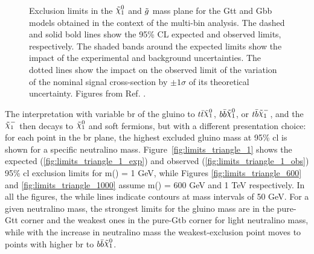 \begin{figure}[htbp]
	\centering 
	\caption{Exclusion limits in the $\ninoone$ and $\tilde{g}$ mass plane
  		for the  Gtt and   Gbb models obtained
		in the context of the multi-bin analysis. The dashed and solid bold lines
		show the 95\% CL expected and observed limits, respectively. The
  		shaded bands around the expected limits show the
                impact of the
  		experimental and background uncertainties. The dotted
  		lines show the impact on the observed limit of the variation of the
  		nominal signal cross-section by $\pm 1 \sigma$ of its theoretical
  		uncertainty. 
  		Figures from Ref. \cite{ATLAS-CONF-2018-041}.	
      }
	\label{fig:limits_GbbGtt_R21}
\end{figure}

The interpretation with variable \gls{br} of the gluino to $ t \bar{t} \ninoone$, $ b \bar{b} \ninoone$, 
or $t \bar{b} \chinoonem$, and the $\chinoonem$ then decays to $\ninoone$ and soft fermions, but with a different 
presentation choice: for each point in the \gls{br} plane, the highest excluded gluino mass at 95\% \gls{cl}
is shown for a specific neutralino mass. 
Figure~\ref{fig:limits_triangle_1} shows the expected (\ref{fig:limits_triangle_1_exp}) and observed (\ref{fig:limits_triangle_1_obs}) 95\%
\gls{cl} exclusion limits for m(\ninoone) = 1 GeV, while Figures \ref{fig:limits_triangle_600} and \ref{fig:limits_triangle_1000} assume 
m(\ninoone) = 600 GeV and 1 TeV respectively. 
In all the figures, the while lines indicate contours at mass intervals of 50 GeV. 
For a given neutralino mass, the strongest limits for the gluino mass are in the pure-Gtt corner and the weakest ones in the 
pure-Gtb corner for light neutralino mass, while with the increase in neutralino mass the weakest-exclusion point 
moves to points with higher \gls{br} to $ b \bar{b} \ninoone$.


